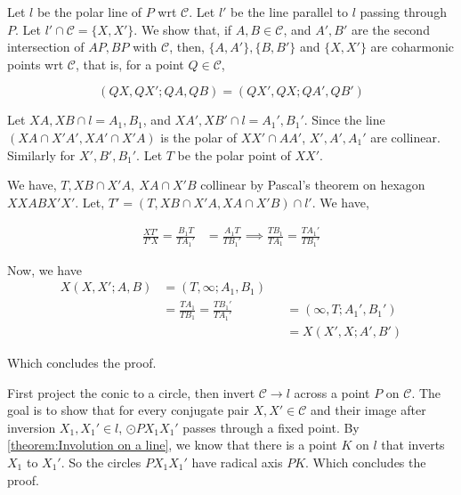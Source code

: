 \begin{solution}
    Let $ l $ be the polar line of $ P $ wrt $ \mathcal{C} $. Let $ l' $ be
    the line parallel to $ l $ passing through $ P $. Let $ l'\cap \mathcal{C}
    = \{X, X'\} $. We show that, if $ A, B\in\mathcal{C} $, and $ A', B' $ are
    the second intersection of $ AP, BP $ with $ \mathcal{C} $, then, $ \{A,
    A'\}, \{B, B'\} $ and $ \{X, X'\} $ are coharmonic points wrt $
    \mathcal{C} $, that is, for a point $ Q\in \mathcal{C} $, 

    \[(QX, QX'; QA, QB) = (QX', QX; QA', QB')\]

    Let $ XA, XB\cap l = A_1, B_1  $, and $ XA', XB'\cap l = A_1', B_1' $.
    Since the line $ \left(XA\cap X'A', XA'\cap X'A\right) $ is the polar of $
    XX'\cap AA' $, $ X', A', A_1' $ are collinear. Similarly for $ X', B',
    B_1' $. Let $ T $ be the polar point of $ XX' $. \\

    \begin{minipage}{.7\linewidth}
        We have, $ T, XB\cap X'A,\ XA\cap X'B $ collinear by Pascal's theorem
        on hexagon $ XXABX'X' $. Let, $ T' = (T, XB\cap X'A, XA\cap X'B)\cap
        l' $. We have,

        \begin{align*}
            \frac{XT'}{T'X}=\frac{B_1T}{TA_1'}&=\frac{A_1T}{TB_1'}
            \implies \frac{TB_1}{TA_1} = \frac{TA_1'}{TB_1'}
        \end{align*}

        Now, we have 
        \begin{align*}
            X(X, X'; A, B) &= (T,\infty; A_1, B_1)&\\[.5em]
                &=\frac{TA_1}{TB_1}=\frac{TB_1'}{TA_1'}&&=(\infty, T; A_1', B_1')\\
                & &&=X(X', X; A', B')
        \end{align*}
    \end{minipage}\hfill%
    \begin{minipage}{.29\linewidth}
    \end{minipage}

    \vspace{1em}

    Which concludes the proof.
\end{solution}


\begin{solution}[Inversion] 
    First project the conic to a circle, then invert $ \mathcal{C}\to l $
    across a point $ P $ on $ \mathcal{C} $. The goal is to show that for
    every conjugate pair $ X, X' \in \mathcal{C} $ and their image after
    inversion $ X_1, X_1'\in l $, $ \odot PX_1X_1' $ passes through a fixed
    point.
    By \autoref{theorem:Involution on a line}, we know that there is a point $
    K $ on $ l $ that inverts $ X_1 $ to $ X_1' $. So the circles $ PX_1X_1' $
    have radical  axis $ PK $. Which concludes the proof.
\end{solution}



